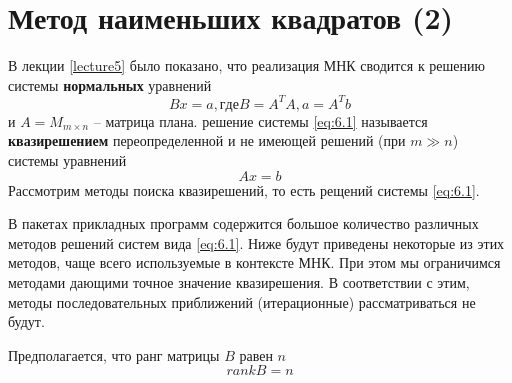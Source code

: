 \section{Метод наименьших квадратов (2)}


В лекции \ref{lecture5} было показано, что реализация МНК сводится к решению системы \textbf{нормальных} уравнений 
\begin{equation} \label{eq:6.1}
	Bx = a, где B = A^TA, a = A^Tb
\end{equation}
и $A=M_{m \times n}$  -- матрица плана. решение системы \ref{eq:6.1} называется \textbf{квазирешением} переопределенной и не имеющей решений (при $m\gg n$) системы уравнений 
\begin{equation}
	Ax = b
\end{equation}
Рассмотрим методы поиска квазирешений, то есть рещений системы \ref{eq:6.1}. 

В пакетах прикладных программ содержится большое количество различных методов решений систем вида \ref{eq:6.1}. Ниже будут приведены некоторые из этих методов, чаще всего используемые в контексте МНК. При этом мы ограничимся методами дающими точное значение квазирешения. В соответствии с этим, методы последовательных приближений (итерационные) рассматриваться не будут.

Предполагается, что ранг матрицы $B$ равен $n$
\begin{equation}
	rank B = n
\end{equation}